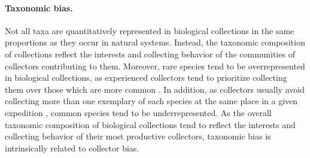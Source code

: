 \paragraph*{Taxonomic bias.}
Not all taxa are quantitatively represented in biological collections in the same proportions as they occur in natural systems.
Instead, the taxonomic composition of collections reflect the interests and collecting behavior of the communities of collectors contributing to them.
Moreover, rare species tend to be overrepresented in biological collections, as experienced collectors tend to prioritize collecting them over those which are more common \cite{Nelson1990}.
In addition, as collectors usually avoid collecting more than one exemplary of each species at the same place in a given expedition \cite{TerSteege2011}, common species tend to be underrepresented.
As the overall taxonomic composition of biological collections tend to reflect the interests and collecting behavior of their most productive collectors, taxonomic bias is intrinsically related to collector bias.
%

